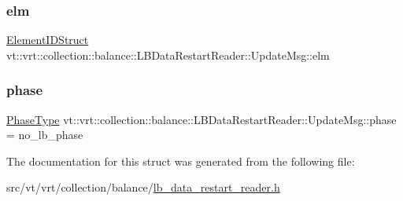 \subsubsection{\texorpdfstring{elm}{elm}}
{\footnotesize\ttfamily \hyperlink{namespacevt_1_1vrt_1_1collection_1_1balance_a9f5b53fafb270212279a4757d2c4cd28}{Element\+I\+D\+Struct} vt\+::vrt\+::collection\+::balance\+::\+L\+B\+Data\+Restart\+Reader\+::\+Update\+Msg\+::elm}

\mbox{\label{structvt_1_1vrt_1_1collection_1_1balance_1_1_l_b_data_restart_reader_1_1_update_msg_af85fa6a0407e7a02715a34448ee50a3f}} 
\subsubsection{\texorpdfstring{phase}{phase}}
{\footnotesize\ttfamily \hyperlink{namespacevt_a46ce6733d5cdbd735d561b7b4029f6d7}{Phase\+Type} vt\+::vrt\+::collection\+::balance\+::\+L\+B\+Data\+Restart\+Reader\+::\+Update\+Msg\+::phase = no\+\_\+lb\+\_\+phase}



The documentation for this struct was generated from the following file\+:\begin{DoxyCompactItemize}
\item 
src/vt/vrt/collection/balance/\hyperlink{lb__data__restart__reader_8h}{lb\+\_\+data\+\_\+restart\+\_\+reader.\+h}\end{DoxyCompactItemize}
